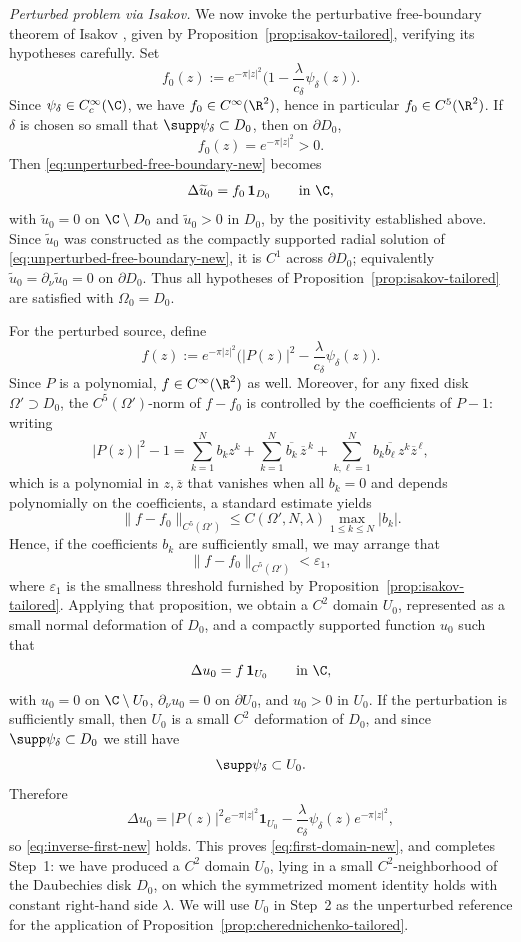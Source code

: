 \smallskip
\emph{Perturbed problem via Isakov.}
We now invoke the perturbative free-boundary theorem of Isakov \cite{Isakov}, given by Proposition~\ref{prop:isakov-tailored}, verifying its hypotheses carefully. Set
\[
f_0(z):=e^{-\pi|z|^2}\Big(1-\frac{\lambda}{c_\delta}\psi_\delta(z)\Big).
\]
Since $\psi_\delta\in C_c^\infty(\C)$, we have $f_0\in C^\infty(\R^2)$, hence in particular $f_0\in C^5(\R^2)$. If $\delta$ is chosen so small that $\supp\psi_\delta\subset D_0$, then on $\partial D_0$,
\[
f_0(z)=e^{-\pi|z|^2}>0.
\]
Then \eqref{eq:unperturbed-free-boundary-new} becomes
\[
\Delta \widetilde u_0=f_0\,\mathbf{1}_{D_0}
\qquad \text{in }\C,
\]
with \(\widetilde u_0=0\) on \(\C\setminus D_0\) and \(\widetilde u_0>0\) in \(D_0\), by the positivity established above. Since \(\widetilde u_0\) was constructed as the compactly supported radial solution of \eqref{eq:unperturbed-free-boundary-new}, it is \(C^1\) across \(\partial D_0\); equivalently \(\widetilde u_0=\partial_\nu \widetilde u_0=0\) on \(\partial D_0\). Thus all hypotheses of Proposition~\ref{prop:isakov-tailored} are satisfied with \(\Omega_0=D_0\).

For the perturbed source, define
\[
f(z):=e^{-\pi|z|^2}\Big(|P(z)|^2-\frac{\lambda}{c_\delta}\psi_\delta(z)\Big).
\]
Since $P$ is a polynomial, $f\in C^\infty(\R^2)$ as well. Moreover, for any fixed disk $\Omega'\supset D_0$, the $C^5(\Omega')$-norm of $f-f_0$ is controlled by the coefficients of $P-1$: writing
\[
|P(z)|^2-1=\sum_{k=1}^N b_k z^k+\sum_{k=1}^N \overline{b_k}\,\overline z^{\,k}+\sum_{k,\ell=1}^N b_k\overline{b_\ell}\,z^k\overline z^{\,\ell},
\]
which is a polynomial in $z,\overline z$ that vanishes when all $b_k=0$ and depends polynomially on the coefficients, a standard estimate yields
\[
\|f-f_0\|_{C^5(\Omega')}\le C(\Omega',N,\lambda)\max_{1\le k\le N}|b_k|.
\]
Hence, if the coefficients $b_k$ are sufficiently small, we may arrange that
\[
\|f-f_0\|_{C^5(\Omega')}<\varepsilon_1,
\]
where $\varepsilon_1$ is the smallness threshold furnished by Proposition~\ref{prop:isakov-tailored}. Applying that proposition, we obtain a \(C^2\) domain \(U_0\), represented as a small normal deformation of \(D_0\), and a compactly supported function \(u_0\) such that
\[
\Delta u_0=f\,\mathbf{1}_{U_0}
\qquad \text{in }\C,
\]
with \(u_0=0\) on \(\C\setminus U_0\), \(\partial_\nu u_0=0\) on \(\partial U_0\), and \(u_0>0\) in \(U_0\).
If the perturbation is sufficiently small, then $U_0$ is a small $C^2$ deformation of $D_0$, and since $\supp\psi_\delta\subset D_0$ we still have
\[
\supp\psi_\delta\subset U_0.
\]
Therefore
\[
\Delta u_0
=
|P(z)|^2e^{-\pi|z|^2}\mathbf{1}_{U_0}
-\frac{\lambda}{c_\delta}\psi_\delta(z)e^{-\pi|z|^2},
\]
so \eqref{eq:inverse-first-new} holds. This proves \eqref{eq:first-domain-new}, and completes Step~1: we have produced a $C^2$ domain $U_0$, lying in a small $C^2$-neighborhood of the Daubechies disk $D_0$, on which the symmetrized moment identity holds with constant right-hand side $\lambda$. We will use $U_0$ in Step~2 as the unperturbed reference for the application of Proposition~\ref{prop:cherednichenko-tailored}.

